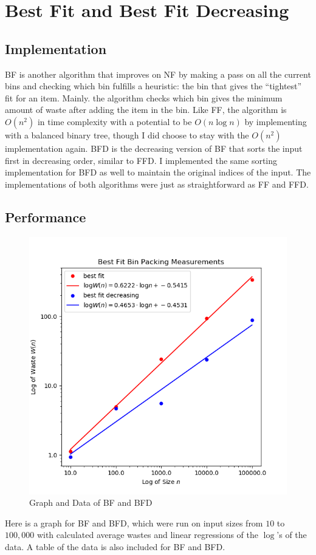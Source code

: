\documentclass{article}
\begin{document}
\section{Best Fit and Best Fit Decreasing}
\subsection{Implementation}
    BF is another algorithm that improves on NF by making a pass on all the 
    current bins and checking which bin fulfills a heuristic: the bin that gives
    the ``tightest'' fit for an item. Mainly. the algorithm checks which bin
    gives the minimum amount of waste after adding the item in the bin. Like FF,
    the algorithm is $O(n^2)$ in time complexity with a potential to be
    $O(n \log{n})$ by implementing with a balanced binary tree, though I did
    choose to stay with the $O(n^2)$ implementation again.
    \nextblurb
    BFD is the decreasing version of BF that sorts the input first in decreasing
    order, similar to FFD. I implemented the same sorting implementation for BFD 
    as well to maintain the original indices of the input. The implementations
    of both algorithms were just as straightforward as FF and FFD.
\subsection{Performance}
    \begin{figure}[H]
        \centering
        \includegraphics[scale=0.60]{"../images/best-fit"}
        \caption{Graph and Data of BF and BFD}
    \end{figure}
    Here is a graph for BF and BFD, which were run on input sizes from $10$ to 
    $100,000$ with calculated average wastes and linear regressions of the 
    $\log$'s of the data. A table of the data is also included for BF and BFD.
\end{document}
